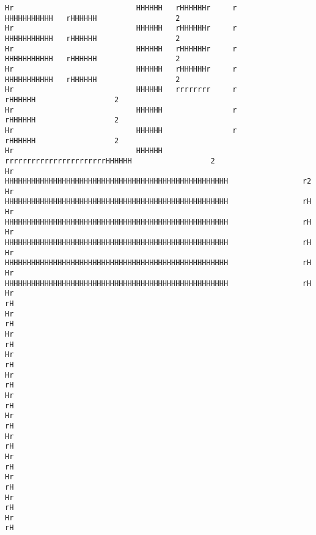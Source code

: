 \documentclass[10pt,a4paper]{article}
\begin{document}
{\begin{verbatim}
Hr                            HHHHHH   rHHHHHHr     r       HHHHHHHHHHH   rHHHHHH                  2
Hr                            HHHHHH   rHHHHHHr     r       HHHHHHHHHHH   rHHHHHH                  2
Hr                            HHHHHH   rHHHHHHr     r       HHHHHHHHHHH   rHHHHHH                  2
Hr                            HHHHHH   rHHHHHHr     r       HHHHHHHHHHH   rHHHHHH                  2
Hr                            HHHHHH   rrrrrrrr     r                     rHHHHHH                  2
Hr                            HHHHHH                r                     rHHHHHH                  2
Hr                            HHHHHH                r                     rHHHHHH                  2
Hr                            HHHHHH                rrrrrrrrrrrrrrrrrrrrrrrHHHHHH                  2
Hr                            HHHHHHHHHHHHHHHHHHHHHHHHHHHHHHHHHHHHHHHHHHHHHHHHHHH                 r2
Hr                            HHHHHHHHHHHHHHHHHHHHHHHHHHHHHHHHHHHHHHHHHHHHHHHHHHH                 rH
Hr                            HHHHHHHHHHHHHHHHHHHHHHHHHHHHHHHHHHHHHHHHHHHHHHHHHHH                 rH
Hr                            HHHHHHHHHHHHHHHHHHHHHHHHHHHHHHHHHHHHHHHHHHHHHHHHHHH                 rH
Hr                            HHHHHHHHHHHHHHHHHHHHHHHHHHHHHHHHHHHHHHHHHHHHHHHHHHH                 rH
Hr                            HHHHHHHHHHHHHHHHHHHHHHHHHHHHHHHHHHHHHHHHHHHHHHHHHHH                 rH
Hr                                                                                                rH
Hr                                                                                                rH
Hr                                                                                                rH
Hr                                                                                                rH
Hr                                                                                                rH
Hr                                                                                                rH
Hr                                                                                                rH
Hr                                                                                                rH
Hr                                                                                                rH
Hr                                                                                                rH
Hr                                                                                                rH
Hr                                                                                                rH

\end{verbatim}}
\end{document}
